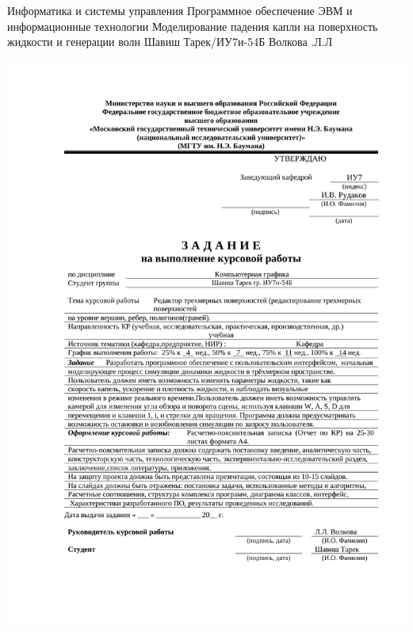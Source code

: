 \documentclass{bmstu}
\begin{document}
\renewcommand{\thelstlisting}{\arabic{lstlisting}}

\makecourseworktitle
    {Информатика и системы управления}
    {Программное обеспечение ЭВМ и информационные технологии}
    {Моделирование падения капли на поверхность жидкости и генерации волн}
    {Шавиш Тарек/ИУ7и-54Б}
    {Волкова .Л.Л}
    {}

\begin{center}
    \includegraphics[width=\textwidth]{inc/img/TZ_good.pdf}
\end{center}

\maketableofcontents

 
 
 
 




\makebibliography
\end{document}
